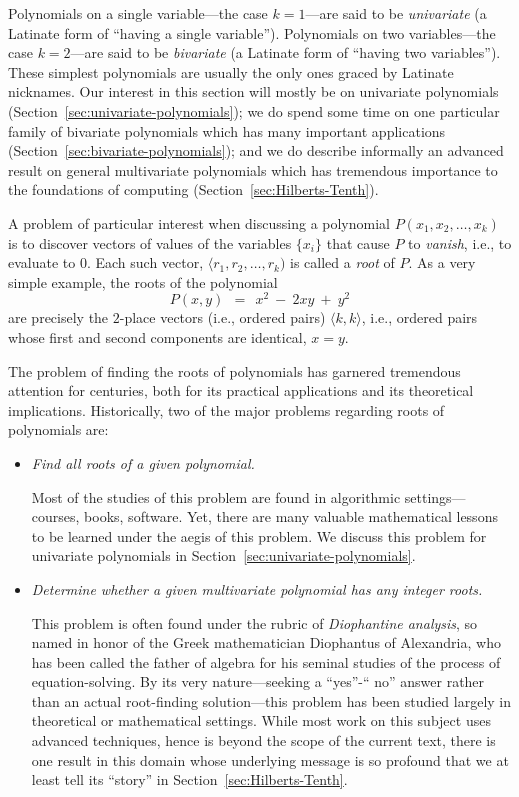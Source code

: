 \smallskip

Polynomials on a single variable---the case $k=1$---are said to be
{\it univariate} (a Latinate form of ``having a single variable'').
 Polynomials on two variables---the case
$k=2$---are said to be {\it bivariate} (a Latinate form of ``having
two variables'').  These simplest polynomials are usually the only
ones graced by Latinate nicknames.  Our interest in this section will
mostly be on univariate polynomials
(Section~\ref{sec:univariate-polynomials}); we do spend some time on
one particular family of bivariate polynomials which has many
important applications (Section~\ref{sec:bivariate-polynomials}); and
we do describe informally an advanced result on general multivariate
polynomials which has tremendous importance to the foundations of
computing (Section~\ref{sec:Hilberts-Tenth}).

\bigskip

A problem of particular interest when discussing a polynomial $P(x_1,
x_2, \ldots, x_k)$ is to discover vectors of values of the variables
$\{x_i\}$ that cause $P$ to {\em vanish}, i.e., to evaluate to $0$.
Each such vector, $\langle r_1, r_2, \ldots, r_k)$ is called a {\it
  root}  of $P$.  As a very simple example, the
roots of the polynomial
\[ P(x,y) \ \ = \ \ x^2 \ - \ 2xy \ + \ y^2 \]
are precisely the $2$-place vectors (i.e., ordered pairs)
$\langle k,k \rangle$, i.e., ordered pairs whose first and second
components are identical, $x=y$.

The problem of finding the roots of polynomials has garnered
tremendous attention for centuries, both for its practical
applications and its theoretical implications.  Historically, two of
the major problems regarding roots of polynomials are:
\begin{itemize}
\item
{\em Find all roots of a given polynomial.}

Most of the studies of this problem are found in algorithmic
settings---courses, books, software.  Yet, there are many valuable
mathematical lessons to be learned under the aegis of this problem.
We discuss this problem for univariate polynomials in
Section~\ref{sec:univariate-polynomials}.

\item
{\em Determine whether a given multivariate polynomial has any
integer roots.}

This problem is often found under the rubric of {\it Diophantine
  analysis}, so named in honor of the Greek mathematician Diophantus
of Alexandria,  who has been called
the father of algebra for his seminal studies of the process of
equation-solving.  By its very nature---seeking a ``{\sc yes}''-``{\sc
  no}'' answer rather than an actual root-finding solution---this
problem has been studied largely in theoretical or mathematical
settings.  While most work on this subject uses advanced techniques,
hence is beyond the scope of the current text, there is one result in
this domain whose underlying message is so profound that we at least
tell its ``story'' in Section~\ref{sec:Hilberts-Tenth}.
\end{itemize}

